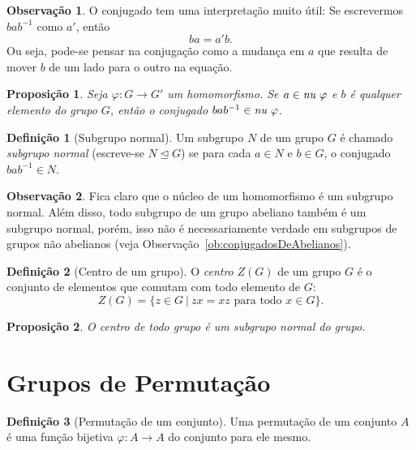 \documentclass[a4paper,12pt]{report}
\newcommand{\nucleoe}{\emph{\text{nu }}}
\theoremstyle{plain}
\newtheorem{proposicao}{Proposição}[section]
\theoremstyle{definition}
\newtheorem{definicao}{Definição}[section]
\newtheorem{observacao}{Observação}[section]
\begin{document}
\begin{observacao}
	O conjugado tem uma interpretação muito útil: Se escrevermos
	\(bab^{-1}\) como \(a'\), então \[ba = a'b.\] Ou seja, pode-se pensar na
	conjugação como a mudança em \(a\) que resulta de mover \(b\) de um lado
	para o outro na equação.
\end{observacao}		


\begin{proposicao}
	Seja $\varphi: G \longrightarrow G'$ um homomorfismo. Se \(a\in \nucleoe\varphi\) e \(b\) é qualquer elemento do grupo \(G\), então o conjugado \(bab^{-1} \in \nucleoe\varphi\).
\end{proposicao}

\begin{definicao}[Subgrupo normal]
	Um subgrupo \(N\) de um grupo \(G\) é chamado \emph{subgrupo normal} (escreve-se $N\trianglelefteq G$) se para cada \(a\in N\) e \(b\in G\), o conjugado
	\(bab^{-1} \in N\).
\end{definicao}

\begin{observacao}
	Fica claro que o núcleo de um homomorfismo é um subgrupo normal. Além disso, todo subgrupo de um grupo abeliano também é um subgrupo normal, porém, isso não é
	necessariamente verdade em subgrupos de grupos não abelianos (veja Observação~\ref{ob:conjugadosDeAbelianos}). 
\end{observacao}

\begin{definicao}[Centro de um grupo]
	O \emph{centro} \(Z(G)\) de um grupo \(G\) é o
	conjunto de elementos que comutam com todo elemento de \(G\):
	\[Z(G) = \{z \in G \ | \ zx = xz \text{ para todo } x \in G\}.\]
\end{definicao}

\begin{proposicao}
	O centro de todo grupo é um subgrupo normal do grupo.
\end{proposicao}

\section{Grupos de Permutação}

\begin{definicao}[Permutação de um conjunto]
		Uma permutação de um conjunto $A$ é uma função bijetiva $\varphi: A \longrightarrow A$ do conjunto para ele mesmo.
\end{definicao}
\end{document}
